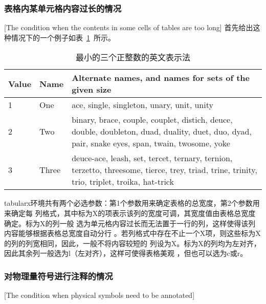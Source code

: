 \subsubsection{表格内某单元格内容过长的情况}[The condition when the contents in
	some cells of tables are too long]
首先给出这种情况下的一个例子如表~\ref{table3}~所示。
\begin{table}[htbp]
	\centering
	\caption{最小的三个正整数的英文表示法}\label{table3}
	\vspace{0.5ex}\centering\wuhao
	\begin{tabularx}{0.7\textwidth}{llX}
		\toprule[1.5pt]
		Value & Name  & Alternate names, and names for sets of the given size                                                                                           \\\midrule[1pt]
		1     & One   & ace, single, singleton, unary, unit, unity                                                                                                      \\
		2     & Two   & binary, brace, couple, couplet, distich, deuce, double, doubleton, duad, duality, duet, duo, dyad, pair, snake eyes, span, twain, twosome, yoke \\
		3     & Three & deuce-ace, leash, set, tercet, ternary, ternion, terzetto, threesome, tierce, trey, triad, trine, trinity, trio, triplet, troika, hat-trick     \\\bottomrule[1.5pt]
	\end{tabularx}
\end{table}
tabularx环境共有两个必选参数：第1个参数用来确定表格的总宽度，第2个参数用来确定每
列格式，其中标为X的项表示该列的宽度可调，其宽度值由表格总宽度确定。标为X的列一般
选为单元格内容过长而无法置于一行的列，这样使得该列内容能够根据表格总宽度自动分行
。若列格式中存在不止一个X项，则这些标为X的列的列宽相同，因此，一般不将内容较短的
列设为X。标为X的列均为左对齐，因此其余列一般选为l（左对齐），这样可使得表格美观
，但也可以选为c或r。

\subsubsection{对物理量符号进行注释的情况}[The condition when physical symbols
	need to be annotated]


